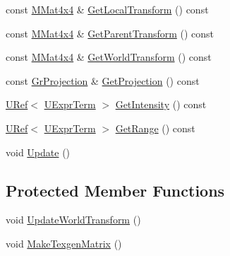 \begin{CompactItemize}
const \hyperlink{class_m_mat4x4}{MMat4x4} \& \hyperlink{class_gr_light_18c9bdf63222395136bb181b5d9f0a9d}{GetLocalTransform} () const 
\item 
const \hyperlink{class_m_mat4x4}{MMat4x4} \& \hyperlink{class_gr_light_14f915382adbb5e9e24f5f5a87c12930}{GetParentTransform} () const 
\item 
const \hyperlink{class_m_mat4x4}{MMat4x4} \& \hyperlink{class_gr_light_6ef30451289f25c79d3b297ac0f773a8}{GetWorldTransform} () const 
\item 
const \hyperlink{class_gr_projection}{GrProjection} \& \hyperlink{class_gr_light_0df072bac3ea1048c4a57aed74bb2361}{GetProjection} () const 
\item 
\hyperlink{class_u_ref}{URef}$<$ \hyperlink{class_u_expr_term}{UExprTerm} $>$ \hyperlink{class_gr_light_d2a8c86c04413bcf5069fc6611b706db}{GetIntensity} () const 
\item 
\hyperlink{class_u_ref}{URef}$<$ \hyperlink{class_u_expr_term}{UExprTerm} $>$ \hyperlink{class_gr_light_dcbb6c218efd950cb13e09851ad83c5a}{GetRange} () const 
\item 
void \hyperlink{class_gr_light_f7fafb95d904499e073a94783b624bf9}{Update} ()
\end{CompactItemize}
\subsection*{Protected Member Functions}
\begin{CompactItemize}
\item 
void \hyperlink{class_gr_light_97c448c6a785fd77ba475f5a0f4a2c5f}{UpdateWorldTransform} ()
\item 
void \hyperlink{class_gr_light_935b67174f2ad695b5f185f8abe7da7a}{MakeTexgenMatrix} ()
\end{CompactItemize}
